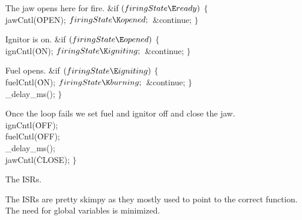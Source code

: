 The jaw opens here for fire.
\Y\B\&{if} ${}(\\{firingState}\E\\{ready}){}$\5
${}\{{}$\1\6
\\{jawCntl}(\.{OPEN});\6
${}\\{firingState}\K\\{opened};{}$\6
\&{continue};\6
\4${}\}{}$\2\par
\fi

Ignitor is on.
\Y\B\&{if} ${}(\\{firingState}\E\\{opened}){}$\5
${}\{{}$\1\6
\\{ignCntl}(\.{ON});\6
${}\\{firingState}\K\\{igniting};{}$\6
\&{continue};\6
\4${}\}{}$\2\par
\fi

Fuel opens.
\Y\B\&{if} ${}(\\{firingState}\E\\{igniting}){}$\5
${}\{{}$\1\6
\\{fuelCntl}(\.{ON});\6
${}\\{firingState}\K\\{burning};{}$\6
\&{continue};\6
\4${}\}{}$\2\6
\\{\_delay\_ms}(); $\}{}$\par
\fi

Once the loop fails we set fuel and ignitor off and close the jaw.
\Y\B\\{ignCntl}(\.{OFF});\6
\\{fuelCntl}(\.{OFF});\6
\\{\_delay\_ms}();\6
\\{jawCntl}(\.{CLOSE}); $\}{}$\par
\fi

The ISRs.

The ISRs are pretty skimpy as they mostly used to point 
to
the correct function.
The need for global variables is minimized.

\fi

